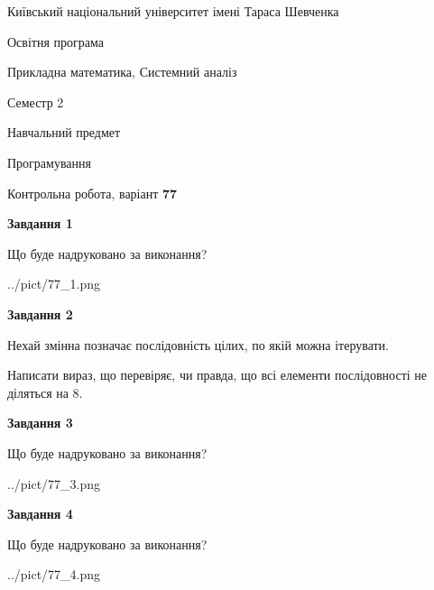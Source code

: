 \documentclass[12pt, ukrainian]{article}
\begin{document}
{{\begin {small}\par
{ \center  Київський національний університет імені Тараса Шевченка \par}
{\parbox {5 cm}{Освітня програма \hfill}{\parbox {8 cm}{Прикладна математика, Системний аналіз \hfill}}\parbox {5 cm}{\hfill Семестр 2}}\par
{\parbox {5 cm} {Навчальний предмет \hfill}\parbox {7 cm}{Програмування \hfill}\parbox {6cm}{\hfill}\par}\vspace{-7pt} \end{small}}{\center Контрольна робота, варіант  \No \textbf
{ 77 }\par}}
{
\begin {large}
{\begin {center}\textbf{Завдання 1}\end {center}}\par
Що буде надруковано за виконання?\par\par
\begin{center}
	{../pict/77_1.png}
\end{center}
\newpage

{\begin {center}\textbf{Завдання 2}\end {center}}\par
Нехай змінна  позначає послідовність цілих, по якій можна ітерувати.

Написати вираз, що перевіряє, чи правда, що всі елементи послідовності не діляться на 8.\par
\newpage

{\begin {center}\textbf{Завдання 3}\end {center}}\par
Що буде надруковано за виконання?
\begin{center}
	{../pict/77_3.png}
\end{center}
\newpage

{\begin {center}\textbf{Завдання 4}\end {center}}\par
Що буде надруковано за виконання?\par
\begin{center}
	{../pict/77_4.png}
\end{center}
\newpage


\end{large}}
\end{document}
